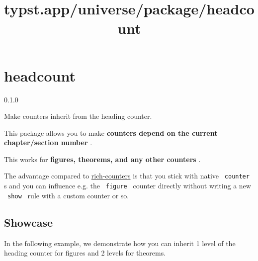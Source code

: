 \title{typst.app/universe/package/headcount}

\label{banner}
\section{headcount}\label{headcount}

{ 0.1.0 }

Make counters inherit from the heading counter.

\label{readme}
This package allows you to make \textbf{counters depend on the current
chapter/section number} .

This works for \textbf{figures, theorems, and any other counters} .

The advantage compared to
\href{https://typst.app/universe/package/rich-counters/}{rich-counters}
is that you stick with native \texttt{\ counter\ } s and you can
influence e.g. the \texttt{\ figure\ } counter directly without writing
a new \texttt{\ show\ } rule with a custom counter or so.

\subsection{Showcase}\label{showcase}

In the following example, we demonstrate how you can inherit 1 level of
the heading counter for figures and 2 levels for theorems.

